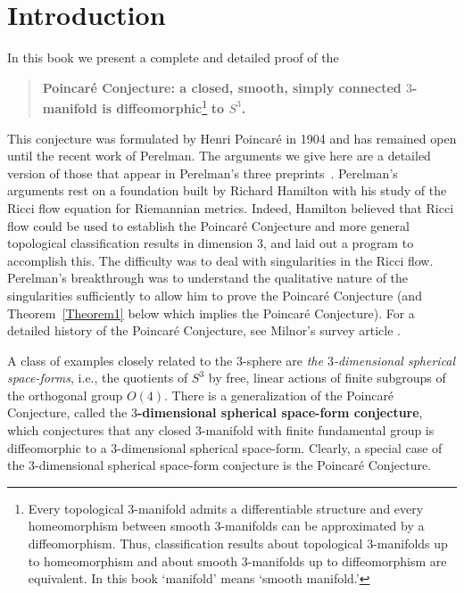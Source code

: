\chapter*{Introduction}
\label{chap:introduction} 
 In this book we present a complete
and detailed proof of the

\begin{quote}{\bf Poincar\'e Conjecture:
a closed, smooth, simply connected $3$-manifold is
diffeomorphic}\footnote{Every topological $3$-manifold admits a
differentiable structure and every homeomorphism between smooth
$3$-manifolds can be approximated by a diffeomorphism. Thus,
classification results about topological $3$-manifolds up to
homeomorphism and about smooth $3$-manifolds up to diffeomorphism
are equivalent. In this book `manifold' means `smooth manifold.'}
{\bf to $S^3$.}
\end{quote}

\noindent %
This conjecture was formulated by Henri Poincar\'e \cite{Poincare}
in 1904 and has remained open until the recent work of Perelman. The
arguments we give here are a detailed version of those that appear
in Perelman's three preprints~\cite{Perelman1,Perelman2,Perelman3}.
Perelman's arguments rest on a foundation built by Richard Hamilton
with his study of the Ricci flow equation for Riemannian metrics.
Indeed, Hamilton believed that Ricci flow could be used to establish
the Poincar\'e Conjecture and more general topological
classification results in dimension $3$, and laid out a program to
accomplish this. The difficulty was to deal with singularities in
the Ricci flow. Perelman's breakthrough was to understand the
qualitative nature of the singularities sufficiently to allow him to
prove the Poincar\'e Conjecture (and Theorem~\ref{Theorem1} below
which implies the Poincar\'e Conjecture).   For
a detailed history of the Poincar\'e Conjecture, see Milnor's survey
article \cite{Milnorsurvey}.

\bigskip
A  class of examples closely related to the $3$-sphere are {\em the
$3$-dimensional spherical space-forms}, i.e.,
the quotients of $S^3$ by free, linear actions of finite subgroups of the
orthogonal group $O(4)$. There is a generalization of the Poincar\'e
Conjecture, called the {\bf $3$-dimensional spherical space-form
conjecture}, which conjectures
that any closed $3$-manifold with finite fundamental group is diffeomorphic to
a $3$-dimensional spherical space-form. Clearly, a special case of the
$3$-dimensional spherical space-form conjecture is the Poincar\'e Conjecture.

